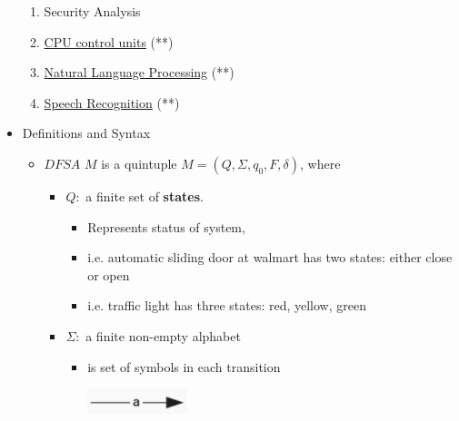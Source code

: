 \documentclass[12pt]{article}
\begin{document}
\begin{itemize}
\begin{enumerate}[1.]
        \item Security Analysis
        \item \underline{CPU control units} (**)
        \item \underline{Natural Language Processing} (**)
        \item \underline{Speech Recognition}  (**)
    \end{enumerate}

    \item Definitions and Syntax
    \begin{itemize}
        \item $DFSA$ $M$ is a quintuple $M = (Q,\Sigma, q_0, F, \delta)$, where
        \begin{itemize}
            \item $Q:$ a finite set of \textbf{states}.
            \begin{itemize}
                \item Represents status of system,
                \item i.e. automatic sliding door at walmart has two states: either close or open
                \item i.e. traffic light has three states: red, yellow, green
            \end{itemize}
            \item $\Sigma:$ a finite non-empty alphabet
            \begin{itemize}
                \item is set of symbols in each transition

                \begin{center}
                \includegraphics[width=0.3 \linewidth]{images/worksheet_8_notes_3.png}
                \end{center}
            \end{itemize}


\end{itemize}
\end{itemize}
\end{itemize}
\end{document}
